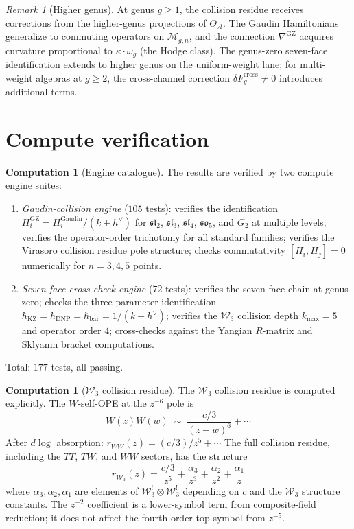 \documentclass[11pt]{article}
\theoremstyle{plain}
\theoremstyle{definition}
\newtheorem{computation}[theorem]{Computation}
\theoremstyle{remark}
\newtheorem{remark}[theorem]{Remark}
\newcommand{\fsl}{\mathfrak{sl}}
\newcommand{\cA}{\mathcal{A}}
\newcommand{\cW}{\mathcal{W}}
\newcommand{\Mbar}{\overline{\mathcal{M}}}
\numberwithin{equation}{section}
\begin{document}
\begin{remark}[Higher genus]\label{rem:higher-genus}
At genus $g \geq 1$, the collision residue receives corrections from
the higher-genus projections of $\Theta_\cA$. The Gaudin
Hamiltonians generalize to commuting operators on $\Mbar_{g,n}$,
and the connection $\nabla^{\mathrm{GZ}}$ acquires curvature
proportional to $\kappa \cdot \omega_g$ (the Hodge class). The
genus-zero seven-face identification extends to higher genus on the
uniform-weight lane; for multi-weight algebras at $g \geq 2$, the
cross-channel correction $\delta F_g^{\mathrm{cross}} \neq 0$
introduces additional terms.
\end{remark}

\section{Compute verification}\label{sec:compute}

\begin{computation}[Engine catalogue]\label{comp:engines}
The results are verified by two compute engine suites:
\begin{enumerate}
 \item \emph{Gaudin-collision engine} ($105$ tests): verifies the
 identification $H_i^{\mathrm{GZ}} = H_i^{\mathrm{Gaudin}} /
 (k+h^\vee)$ for $\fsl_2$, $\fsl_3$, $\fsl_4$, $\mathfrak{so}_5$,
 and $G_2$ at multiple levels; verifies the operator-order
 trichotomy for all standard families; verifies the Virasoro
 collision residue pole structure; checks commutativity
 $[H_i, H_j] = 0$ numerically for $n = 3, 4, 5$ points.
 \item \emph{Seven-face cross-check engine} ($72$ tests): verifies
 the seven-face chain at genus zero; checks the three-parameter
 identification $\hbar_{\mathrm{KZ}} = \hbar_{\mathrm{DNP}} =
 \hbar_{\mathrm{bar}} = 1/(k+h^\vee)$; verifies the $\cW_3$
 collision depth $k_{\max} = 5$ and operator order $4$;
 cross-checks against the Yangian $R$-matrix and Sklyanin bracket
 computations.
\end{enumerate}
Total: $177$ tests, all passing.
\end{computation}

\begin{computation}[$\cW_3$ collision residue]\label{comp:w3}
The $\cW_3$ collision residue is computed explicitly. The $W$-self-OPE
at the $z^{-6}$ pole is
\[
 W(z)W(w) \;\sim\;
 \frac{c/3}{(z-w)^6} + \cdots
\]
After $d\log$ absorption: $r_{WW}(z) = (c/3)/z^5 + \cdots$
The full collision residue, including the $TT$, $TW$, and $WW$
sectors, has the structure
\[
 r_{\cW_3}(z) =
 \frac{c/3}{z^5}
 + \frac{\alpha_3}{z^3}
 + \frac{\alpha_2}{z^2}
 + \frac{\alpha_1}{z}
\]
where \(\alpha_3,\alpha_2,\alpha_1\) are elements of
\(\cW_3^! \otimes \cW_3^!\) depending on \(c\) and the \(\cW_3\)
structure constants. The \(z^{-2}\) coefficient is a lower-symbol
term from composite-field reduction; it does not affect the
fourth-order top symbol from \(z^{-5}\).
\end{computation}
\end{document}
